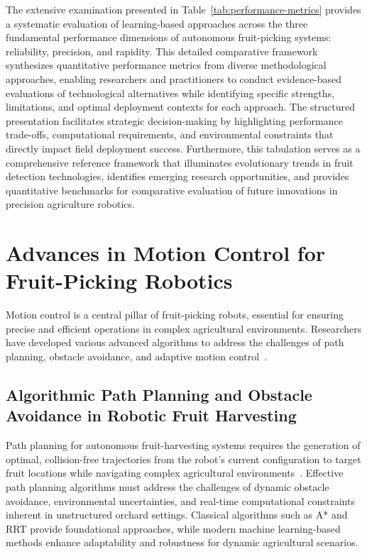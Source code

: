 \documentclass{ieeeaccess}
\begin{document}
The extensive examination presented in Table~\ref{tab:performance-metrics} provides a systematic evaluation of learning-based approaches across the three fundamental performance dimensions of autonomous fruit-picking systems: reliability, precision, and rapidity. This detailed comparative framework synthesizes quantitative performance metrics from diverse methodological approaches, enabling researchers and practitioners to conduct evidence-based evaluations of technological alternatives while identifying specific strengths, limitations, and optimal deployment contexts for each approach. The structured presentation facilitates strategic decision-making by highlighting performance trade-offs, computational requirements, and environmental constraints that directly impact field deployment success. Furthermore, this tabulation serves as a comprehensive reference framework that illuminates evolutionary trends in fruit detection technologies, identifies emerging research opportunities, and provides quantitative benchmarks for comparative evaluation of future innovations in precision agriculture robotics.

\section{Advances in Motion Control for Fruit-Picking Robotics}
Motion control is a central pillar of fruit-picking robots, essential for ensuring precise and efficient operations in complex agricultural environments. Researchers have developed various advanced algorithms to address the challenges of path planning, obstacle avoidance, and adaptive motion control~\cite{Ahmad:2023_bnb, Loganathan:2024_hho_avoa, Teo:2020, Arrouch:2022b, 10746490}.

\subsection{Algorithmic Path Planning and Obstacle Avoidance in Robotic Fruit Harvesting}
Path planning for autonomous fruit-harvesting systems requires the generation of optimal, collision-free trajectories from the robot's current configuration to target fruit locations while navigating complex agricultural environments~\cite{Leong:2024_review}. Effective path planning algorithms must address the challenges of dynamic obstacle avoidance, environmental uncertainties, and real-time computational constraints inherent in unstructured orchard settings. Classical algorithms such as A* and RRT provide foundational approaches, while modern machine learning-based methods enhance adaptability and robustness for dynamic agricultural scenarios.
\end{document}
